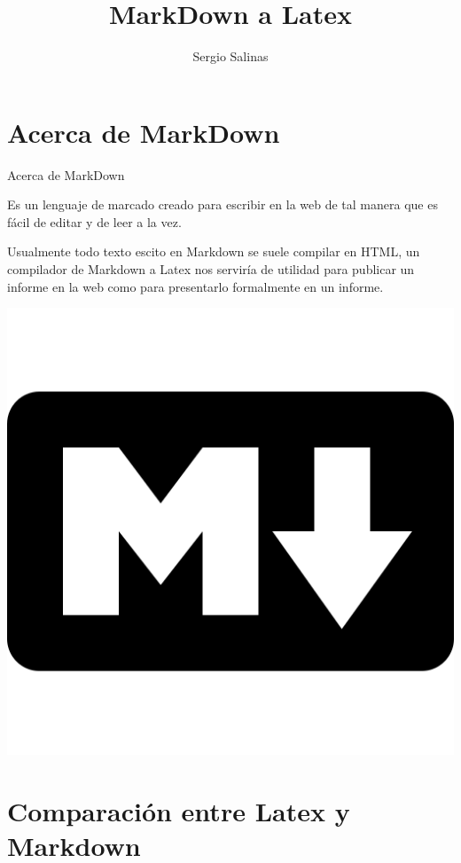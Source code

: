 \documentclass[11pt]{beamer}
\author{Sergio Salinas}
\title{MarkDown a Latex}
\institute{Universidad Santiago de Chile}
\begin{document}
\begin{frame}
\titlepage
\end{frame}

\begin{frame}
\tableofcontents
\end{frame}

\section{Acerca de MarkDown}

\begin{frame}{Acerca de MarkDown}

Es un lenguaje de marcado creado para escribir en la web de tal manera que es fácil de editar y de leer a la vez.

Usualmente todo texto escito en Markdown se suele compilar en HTML, un compilador de Markdown a Latex nos serviría de utilidad para publicar un informe en la web como para presentarlo formalmente en un informe.
\begin{center}
\includegraphics[scale=0.2]{imagenes/markdown-512.png} 
\end{center}
\end{frame}

\section{Comparación entre Latex y Markdown}
\end{document}
